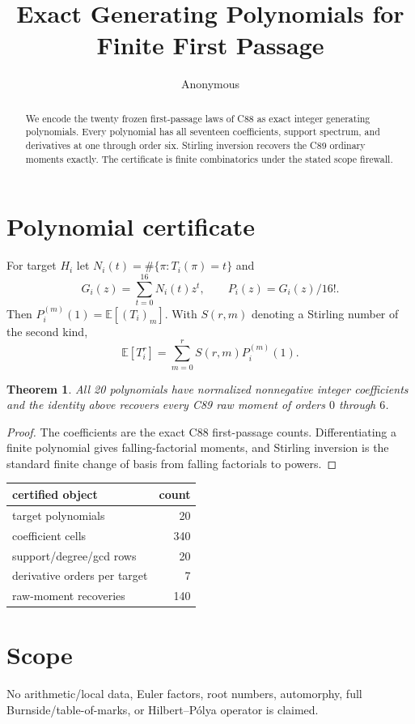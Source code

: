 \documentclass[10pt]{article}
\title{Exact Generating Polynomials for Finite First Passage}
\author{Anonymous}
\date{}
\newtheorem{theorem}{Theorem}
\begin{document}
\maketitle
\begin{abstract}
We encode the twenty frozen first-passage laws of C88 as exact integer
generating polynomials. Every polynomial has all seventeen coefficients,
support spectrum, and derivatives at one through order six. Stirling inversion
recovers the C89 ordinary moments exactly. The certificate is finite
combinatorics under the stated scope firewall.
\end{abstract}
\section{Polynomial certificate}
For target $H_i$ let $N_i(t)=\#\{\pi:T_i(\pi)=t\}$ and
\[
G_i(z)=\sum_{t=0}^{16}N_i(t)z^t,\qquad P_i(z)=G_i(z)/16!.
\]
Then $P_i^{(m)}(1)=\mathbb E[(T_i)_m]$. With $S(r,m)$ denoting a
Stirling number of the second kind,
\[
\mathbb E[T_i^r]=\sum_{m=0}^r S(r,m)P_i^{(m)}(1).
\]
\begin{theorem}
All 20 polynomials have normalized nonnegative integer coefficients and the
identity above recovers every C89 raw moment of orders $0$ through $6$.
\end{theorem}
\begin{proof}
The coefficients are the exact C88 first-passage counts. Differentiating a
finite polynomial gives falling-factorial moments, and Stirling inversion is
the standard finite change of basis from falling factorials to powers.
\end{proof}
\begin{center}
\begin{tabular}{lr}
\toprule
certified object & count\\
\midrule
target polynomials & 20\\
coefficient cells & 340\\
support/degree/gcd rows & 20\\
derivative orders per target & 7\\
raw-moment recoveries & 140\\
\bottomrule
\end{tabular}
\end{center}
\section{Scope}
No arithmetic/local data, Euler factors, root numbers, automorphy, full
Burnside/table-of-marks, or Hilbert--Pólya operator is claimed.
\end{document}
